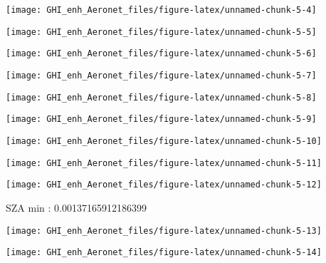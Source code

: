\documentclass[
  10pt,
  a4paper,oneside]{article}
\begin{document}
\begin{center}\texttt{[image: GHI\_enh\_Aeronet\_files/figure-latex/unnamed-chunk-5-4]} \end{center}

\begin{center}\texttt{[image: GHI\_enh\_Aeronet\_files/figure-latex/unnamed-chunk-5-5]} \end{center}

\begin{center}\texttt{[image: GHI\_enh\_Aeronet\_files/figure-latex/unnamed-chunk-5-6]} \end{center}

\begin{center}\texttt{[image: GHI\_enh\_Aeronet\_files/figure-latex/unnamed-chunk-5-7]} \end{center}

\begin{center}\texttt{[image: GHI\_enh\_Aeronet\_files/figure-latex/unnamed-chunk-5-8]} \end{center}

\begin{center}\texttt{[image: GHI\_enh\_Aeronet\_files/figure-latex/unnamed-chunk-5-9]} \end{center}

\begin{center}\texttt{[image: GHI\_enh\_Aeronet\_files/figure-latex/unnamed-chunk-5-10]} \end{center}

\begin{center}\texttt{[image: GHI\_enh\_Aeronet\_files/figure-latex/unnamed-chunk-5-11]} \end{center}

\begin{center}\texttt{[image: GHI\_enh\_Aeronet\_files/figure-latex/unnamed-chunk-5-12]} \end{center}

SZA min : 0.00137165912186399

\begin{center}\texttt{[image: GHI\_enh\_Aeronet\_files/figure-latex/unnamed-chunk-5-13]} \end{center}

\begin{center}\texttt{[image: GHI\_enh\_Aeronet\_files/figure-latex/unnamed-chunk-5-14]} \end{center}
\end{document}

